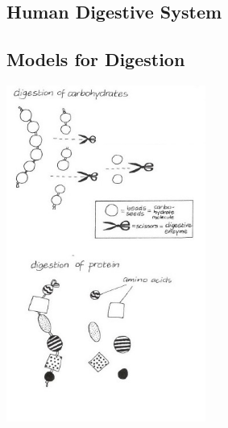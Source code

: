 \begin{multicols}{2}
\columnbreak


\section*{Human Digestive System} 


\subsection{Models for Digestion} %

\begin{center}
\includegraphics[width=0.49\textwidth]{./img/vso/digestion-models.jpg}
\end{center}


\end{multicols}
